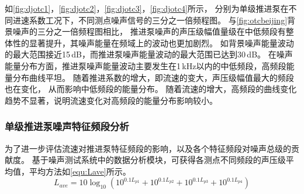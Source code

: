 如\autoref{fig:djotc1}，\autoref{fig:djotc2}，\autoref{fig:djotc3}，\autoref{fig:djotc4}所示，
分别为单级推进泵在不同进速系数工况下，不同测点噪声信号的三分之一倍频程图。
与\autoref{fig:otcbeijing}背景噪声的三分之一倍频程图相比，
推进泵噪声的声压级幅值量级在中低频段有整体性的显著提升，其噪声能量在频域上的波动也更加剧烈。
如背景噪声能量波动的最大范围接近15\,dB，而推进泵噪声能量波动的最大范围已达到30\,dB。
在噪声能量分布方面，推进泵噪声能量波动主要发生在1\,kHz以内的中低频段，高频段能量分布曲线平坦。
随着推进系数的增大，即流速的变大，声压级幅值最大的频段也在变化，
从而影响中低频段的能量分布。
随着流速的增大，高频段的曲线变化趋势不显著，说明流速变化对高频段的能量分布影响较小。
\begin{comment}
\begin{figure}[htbp]
        \centering
        \subfigure[pic1.]{
        \texttt{[image: 3dj2\_otc.png]}
        }
\end{figure}
\addtocounter{figure}{-1}
\begin{figure}[htbp]
        \centering
        \addtocounter{figure}{1} 
        \subfigure[pic2.]{
        \texttt{[image: 3dj7\_otc.png]}
        }
\end{figure}
\addtocounter{figure}{-1}
\begin{figure}[htbp]
        \centering
        \addtocounter{figure}{1} 
        \vspace{0.02cm}
        \subfigure[pic2.]{
        \texttt{[image: 3dj6\_otc.png]}
        }
\end{figure}
\addtocounter{figure}{-1}
\begin{figure}[htbp]
        \centering
        \addtocounter{figure}{1} 
        \vspace{0.02cm}
        \subfigure[pic2.]{
        \texttt{[image: 3dj3\_otc.png]}
        }
        \caption{\label{fig:dj_modle}不同工况下单级推进泵水下噪声三分之一倍频程图}
\end{figure}
\end{comment}
\subsubsection{单级推进泵噪声特征频段分析}
为了进一步评估流速对推进泵特征频段的影响，以及各个特征频段对噪声总级的贡献度。
基于噪声测试系统中的数据分析模块，可获得各测点不同频段的声压级平均值，平均方法如\autoref{equ:Lave}所示。
\begin{equation}
    \label{equ:Lave}
    L_{ave}=10\log_{10}\left ( {10^{0.1L_{p1}}}+{10^{0.1L_{p2}}}+{10^{0.1L_{p3}}}+{10^{0.1L_{p4}}}  \right ) 
\end{equation}

